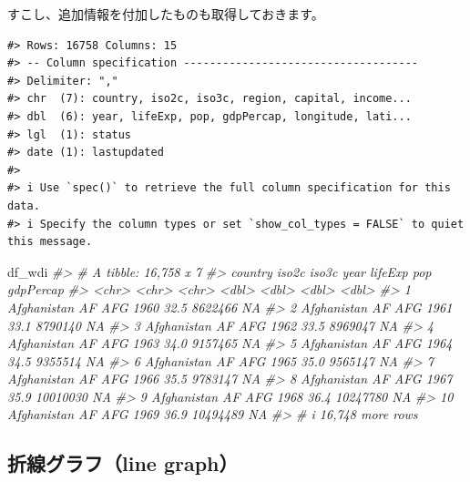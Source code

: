 \documentclass[
  xelatex, ja=standard]{bxjsbook}
\newenvironment{Shaded}{\begin{snugshade}}{\end{snugshade}}
\newcommand{\CommentTok}[1]{\textcolor[rgb]{0.56,0.35,0.01}{\textit{#1}}}
\newcommand{\NormalTok}[1]{#1}
\theoremstyle{definition}
\theoremstyle{definition}
\theoremstyle{definition}
\theoremstyle{definition}
\theoremstyle{remark}
\begin{document}
すこし、追加情報を付加したものも取得しておきます。

\begin{verbatim}
#> Rows: 16758 Columns: 15
#> -- Column specification ------------------------------------
#> Delimiter: ","
#> chr  (7): country, iso2c, iso3c, region, capital, income...
#> dbl  (6): year, lifeExp, pop, gdpPercap, longitude, lati...
#> lgl  (1): status
#> date (1): lastupdated
#> 
#> i Use `spec()` to retrieve the full column specification for this data.
#> i Specify the column types or set `show_col_types = FALSE` to quiet this message.
\end{verbatim}

\begin{Shaded}
\begin{Highlighting}[]
\NormalTok{df\_wdi}
\CommentTok{\#\textgreater{} \# A tibble: 16,758 x 7}
\CommentTok{\#\textgreater{}    country     iso2c iso3c  year lifeExp      pop gdpPercap}
\CommentTok{\#\textgreater{}    \textless{}chr\textgreater{}       \textless{}chr\textgreater{} \textless{}chr\textgreater{} \textless{}dbl\textgreater{}   \textless{}dbl\textgreater{}    \textless{}dbl\textgreater{}     \textless{}dbl\textgreater{}}
\CommentTok{\#\textgreater{}  1 Afghanistan AF    AFG    1960    32.5  8622466        NA}
\CommentTok{\#\textgreater{}  2 Afghanistan AF    AFG    1961    33.1  8790140        NA}
\CommentTok{\#\textgreater{}  3 Afghanistan AF    AFG    1962    33.5  8969047        NA}
\CommentTok{\#\textgreater{}  4 Afghanistan AF    AFG    1963    34.0  9157465        NA}
\CommentTok{\#\textgreater{}  5 Afghanistan AF    AFG    1964    34.5  9355514        NA}
\CommentTok{\#\textgreater{}  6 Afghanistan AF    AFG    1965    35.0  9565147        NA}
\CommentTok{\#\textgreater{}  7 Afghanistan AF    AFG    1966    35.5  9783147        NA}
\CommentTok{\#\textgreater{}  8 Afghanistan AF    AFG    1967    35.9 10010030        NA}
\CommentTok{\#\textgreater{}  9 Afghanistan AF    AFG    1968    36.4 10247780        NA}
\CommentTok{\#\textgreater{} 10 Afghanistan AF    AFG    1969    36.9 10494489        NA}
\CommentTok{\#\textgreater{} \# i 16,748 more rows}
\end{Highlighting}
\end{Shaded}

\hypertarget{section-1}{%
\subsection{}\label{section-1}}

\hypertarget{ux6298ux7ddaux30b0ux30e9ux30d5line-graph}{%
\subsection{\texorpdfstring{\textbf{折線グラフ（line graph）}}{折線グラフ（line graph）}}\label{ux6298ux7ddaux30b0ux30e9ux30d5line-graph}}
\end{document}
